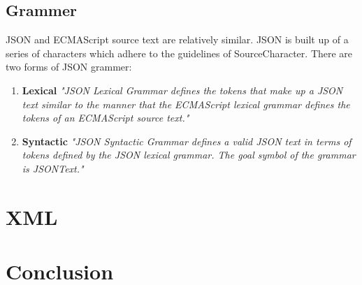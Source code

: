 \subsection{Grammer}
JSON and ECMAScript source text are relatively similar. JSON is built up of a series of characters which adhere to the guidelines of SourceCharacter. There are two forms of JSON grammer:
\begin{enumerate}
\item \textbf{Lexical} \emph{"JSON Lexical Grammar defines the tokens that make up a JSON text similar to the manner that the ECMAScript lexical grammar defines the tokens of an ECMAScript source text."\cite{ecma}} 
\item \textbf{Syntactic} \emph{"JSON Syntactic Grammar defines a valid JSON text in terms of tokens defined by the JSON lexical grammar. The goal symbol of the grammar is JSONText."\cite{ecma}}
\end{enumerate}



\section{XML}

\section{Conclusion}
